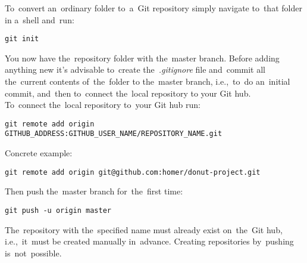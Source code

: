 \label{initrepo}
To~convert an~ordinary folder to~a~Git repository simply navigate to~that folder in a~shell and~run:
\begin{lstlisting}[frame=no]
    git init
\end{lstlisting}
\noindent You now have the~repository folder with the~master branch.
Before adding anything new it's advisable to~create the~\textit{.gitignore} file and~commit all the~current contents of~the~folder to the~master branch, i.e.,~to~do an~initial commit, and~then to~connect the~local repository to your Git hub.\\

\noindent To~connect the~local repository to~your Git hub run:
\begin{lstlisting}[frame=no]
    git remote add origin GITHUB_ADDRESS:GITHUB_USER_NAME/REPOSITORY_NAME.git
\end{lstlisting}
\noindent Concrete example:
\begin{lstlisting}[frame=no]
    git remote add origin git@github.com:homer/donut-project.git
\end{lstlisting}
\noindent Then push the~master branch for~the~first time:
\begin{lstlisting}[frame=no]
    git push -u origin master
\end{lstlisting}

\warning The~repository with the~specified name must already exist on~the~Git hub, i.e.,~it~must be created manually in~advance.
Creating repositories by~pushing is~not~possible.
